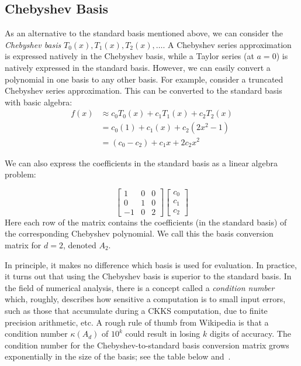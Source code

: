 \documentclass[../fheimpl.tex]{subfiles}
\begin{document}
\subsection{Chebyshev Basis}
As an alternative to the standard basis mentioned above, we can consider the \emph{Chebyshev basis} ${T_0(x), T_1(x), T_2(x), \ldots}$. A Chebyshev series approximation is expressed natively in the Chebyshev basis, while a Taylor series (at $a=0$) is natively expressed in the standard basis. However, we can easily convert a polynomial in one basis to any other basis. For example, consider a truncated Chebyshev series approximation. This can be converted to the standard basis with basic algebra:
\begin{align*}
	f(x) & \approx c_0T_0(x) + c_1T_1(x) + c_2T_2(x) \\
   & = c_0(1) + c_1(x) + c_2(2x^2-1) \\
   & = (c_0-c_2) + c_1x + 2c_2x^2
\end{align*}

We can also express the coefficients in the standard basis as a linear algebra problem:

\[
\begin{bmatrix}
	1       & 0 & 0 \\
	0       & 1 & 0 \\
	-1      & 0 & 2
\end{bmatrix}
\begin{bmatrix}
	c_0 \\
	c_1 \\
	c_2
\end{bmatrix}
\]
Here each row of the matrix contains the coefficients (in the standard basis) of the corresponding Chebyshev polynomial. We call this the basis conversion matrix for $d=2$, denoted $A_2$.

In principle, it makes no difference which basis is used for evaluation. In practice, it turns out that using the Chebyshev basis is superior to the standard basis. In the field of numerical analysis, there is a concept called a \emph{condition number} which, roughly, describes how sensitive a computation is to small input errors, such as those that accumulate during a CKKS computation, due to finite precision arithmetic, etc. A rough rule of thumb from Wikipedia is that a condition number $\kappa(A_d)$ of $10^k$ could result in losing $k$ digits of accuracy. The condition number for the Chebyshev-to-standard basis conversion matrix grows exponentially in the size of the basis; see the table below and~\cite{conditionnum}.
\end{document}
